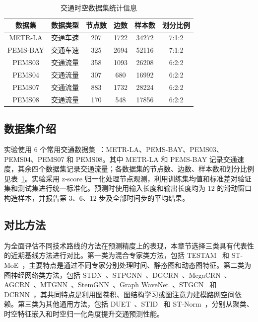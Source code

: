 \begin{table}[t!]
    \centering
    \caption{交通时空数据集统计信息}
    \begin{tabular}{c|ccccc}
    \toprule
        \textbf{数据集} & \textbf{数据类型} & \textbf{节点数} & \textbf{边数} & \textbf{样本数} & \textbf{划分比例} \\
        \midrule
        METR-LA & 交通车速 & 207 & 1722 & 34272 & 7:1:2 \\
        PEMS-BAY & 交通车速 & 325 & 2694 & 52116 & 7:1:2 \\
        PEMS03 & 交通流量 & 358 & 1093 & 26208 & 6:2:2 \\
        PEMS04 & 交通流量 & 307 & 680 & 16992 & 6:2:2 \\
        PEMS07 & 交通流量 & 883 & 1732 & 28224 & 6:2:2 \\
        PEMS08 & 交通流量 & 170 & 548 & 17856 & 6:2:2 \\
    \bottomrule
    \end{tabular}
    \label{tab:statics-datasets}
    \vspace{-1.em}
\end{table}

\subsection{数据集介绍}

实验使用 6 个常用交通数据集~\cite{basicts}：METR-LA、PEMS-BAY、PEMS03、PEMS04、PEMS07 和 PEMS08。其中 METR-LA 和 PEMS-BAY 记录交通速度，其余四个数据集记录交通流量；各数据集的节点数、边数、样本数和划分比例见表~\ref{tab:statics-datasets}。实验采用 z-score 归一化处理节点观测，利用训练集均值和标准差对验证集和测试集进行统一标准化。预测时使用输入长度和输出长度均为 $12$ 的滑动窗口构造样本，并报告第 $3$、$6$、$12$ 步及全部时间步的平均结果。

\subsection{对比方法}

为全面评估不同技术路线的方法在预测精度上的表现，本章节选择三类具有代表性的近期基线方法进行对比。第一类为混合专家类方法，包括 TESTAM~\cite{testam} 和 ST-MoE~\cite{st-moe}，主要特点是通过不同专家分别处理时间、静态图和动态图特征。第二类为图神经网络类方法，包括 STDN~\cite{stdn}、STPGNN~\cite{stpgnn}、DGCRN~\cite{dgcrn}、MegaCRN~\cite{megacrn}、AGCRN~\cite{agcrn}、MTGNN~\cite{mtgnn}、StemGNN~\cite{stemgnn}、Graph WaveNet~\cite{gwnet}、STGCN~\cite{stgcn} 和 DCRNN~\cite{dcrnn}，其共同特点是利用图卷积、图结构学习或图注意力建模路网空间依赖。第三类为其他通用方法，包括 DUET~\cite{duet}、STID~\cite{stid} 和 ST-Norm~\cite{st-norm}，分别从聚类、时空特征嵌入和时空归一化角度提升交通预测性能。

